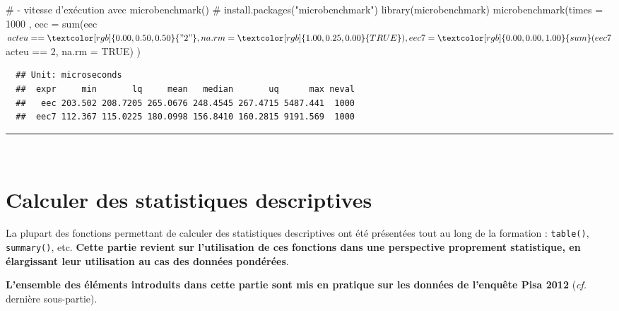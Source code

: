 \documentclass[12pt,twosided, notitlepage]{book}
\newenvironment{Shaded}{}{}
\newcommand{\KeywordTok}[1]{\textcolor[rgb]{0.00,0.00,1.00}{#1}}
\newcommand{\DataTypeTok}[1]{#1}
\newcommand{\DecValTok}[1]{#1}
\newcommand{\StringTok}[1]{\textcolor[rgb]{0.00,0.50,0.50}{#1}}
\newcommand{\CommentTok}[1]{\textcolor[rgb]{0.00,0.50,0.00}{#1}}
\newcommand{\OtherTok}[1]{\textcolor[rgb]{1.00,0.25,0.00}{#1}}
\newcommand{\OperatorTok}[1]{#1}
\newcommand{\NormalTok}[1]{#1}
\renewenvironment{Shaded}{\begin{snugshade}}{\end{snugshade}}
\begin{document}
\begin{enumerate}
\begin{enumerate}
\begin{Shaded}
\begin{Highlighting}[]
\CommentTok{# - vitesse d'exécution avec microbenchmark()}
\CommentTok{# install.packages("microbenchmark")}
\KeywordTok{library}\NormalTok{(microbenchmark)}
\KeywordTok{microbenchmark}\NormalTok{(}\DataTypeTok{times =} \DecValTok{1000}
\NormalTok{  , }\DataTypeTok{eec =} \KeywordTok{sum}\NormalTok{(eec}\OperatorTok{$}\NormalTok{acteu }\OperatorTok{==}\StringTok{ "2"}\NormalTok{, }\DataTypeTok{na.rm =} \OtherTok{TRUE}\NormalTok{)}
\NormalTok{  , }\DataTypeTok{eec7 =} \KeywordTok{sum}\NormalTok{(eec7}\OperatorTok{$}\NormalTok{acteu }\OperatorTok{==}\StringTok{ }\DecValTok{2}\NormalTok{, }\DataTypeTok{na.rm =} \OtherTok{TRUE}\NormalTok{)}
\NormalTok{)}
\end{Highlighting}
\end{Shaded}

\begin{verbatim}
  ## Unit: microseconds
  ##  expr     min       lq     mean   median       uq      max neval
  ##   eec 203.502 208.7205 265.0676 248.4545 267.4715 5487.441  1000
  ##  eec7 112.367 115.0225 180.0998 156.8410 160.2815 9191.569  1000
\end{verbatim}

    \begin{center} \rule{0.5\linewidth}{\linethickness}\end{center}

    \bigskip  \fi 
  \end{enumerate}
\end{enumerate}

~

\section{Calculer des statistiques
descriptives}\label{calculer-des-statistiques-descriptives}

La plupart des fonctions permettant de calculer des statistiques
descriptives ont été présentées tout au long de la formation :
\texttt{table()}, \texttt{summary()}, etc. \textbf{Cette partie revient
sur l'utilisation de ces fonctions dans une perspective proprement
statistique, en élargissant leur utilisation au cas des données
pondérées}.

\textbf{L'ensemble des éléments introduits dans cette partie sont mis en
pratique sur les données de l'enquête Pisa 2012} (\emph{cf.} dernière
sous-partie).
\end{document}
